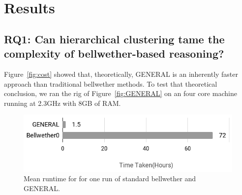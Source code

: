 \documentclass[10pt,journal,compsoc]{IEEEtran}
\newcommand{\fig}[1]{Figure~\ref{fig:#1}}
\begin{document}
\section{Results}
\label{sec:results}




\subsection*{RQ1: Can hierarchical clustering tame the complexity of bellwether-based reasoning?}
\label{sec:rq1}


 
\fig{cost} showed that, theoretically,
GENERAL is an inherently faster approach than traditional bellwether methods.
To test that theoretical
conclusion,
we ran the rig of \fig{GENERAL} on
an four core machine running at 2.3GHz with 8GB of RAM. 



\begin{figure}[!b]
    \centering
    \includegraphics[width=\linewidth]{figs/Time.png}
    \caption{Mean runtime for for one run of standard bellwether and GENERAL.}
    \label{fig:time}
\end{figure}
\end{document}
